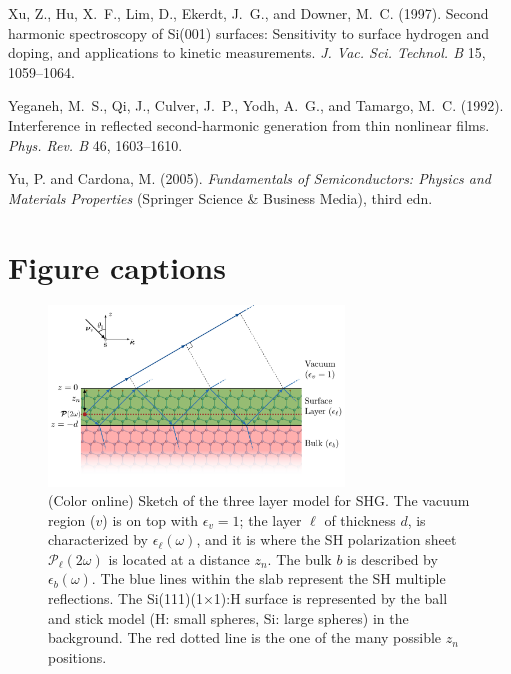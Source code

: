 \documentclass[utf8]{frontiersSCNS}
\begin{document}
\begin{thebibliography}{39}
Xu, Z., Hu, X.~F., Lim, D., Ekerdt, J.~G., and Downer, M.~C. (1997).
\newblock Second harmonic spectroscopy of {Si}(001) surfaces: {Sensitivity} to
  surface hydrogen and doping, and applications to kinetic measurements.
\newblock \emph{J. Vac. Sci. Technol. B} 15, 1059--1064.
\newblock {}

Yeganeh, M.~S., Qi, J., Culver, J.~P., Yodh, A.~G., and Tamargo, M.~C. (1992).
\newblock Interference in reflected second-harmonic generation from thin
  nonlinear films.
\newblock \emph{Phys. Rev. B} 46, 1603--1610.
\newblock {}

Yu, P. and Cardona, M. (2005).
\newblock \emph{Fundamentals of {Semiconductors}: {Physics} and {Materials}
  {Properties}} (Springer Science \& Business Media), third edn.

\end{thebibliography}



\section*{Figure captions}

\begin{figure}[b]
\centering 
\includegraphics[width=0.7\textwidth]{fig1}
\caption{(Color online) Sketch of the three layer model for SHG. The vacuum
region ($v$) is on top with $\epsilon_{v}=1$; the layer $\ell$ of thickness $d$,
is characterized by $\epsilon_{\ell}(\omega)$, and it is where the SH
polarization sheet $\boldsymbol{\mathcal{P}}_{\ell}(2\omega)$ is located at a
distance $z_{n}$. The bulk $b$ is described by $\epsilon_{b}(\omega)$. The blue
lines within the slab represent the SH multiple reflections. The
Si(111)(1$\times$1):H surface is represented by the ball and stick model (H:
small spheres, Si: large spheres) in the background. The red dotted line is the
one of the many possible $z_{n}$ positions.}
\label{fig:MR3layer2w}
\end{figure}
\end{document}
